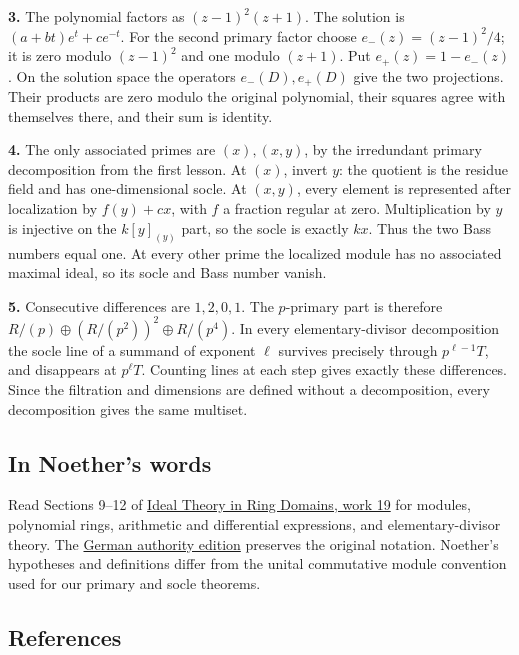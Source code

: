 \documentclass[
]{article}
\begin{document}
\textbf{3.} The polynomial factors as \((z-1)^2(z+1)\). The solution is
\((a+bt)e^t+ce^{-t}\). For the second primary factor choose
\(e_-(z)=(z-1)^2/4\); it is zero modulo \((z-1)^2\) and one modulo
\((z+1)\). Put \(e_+(z)=1-e_-(z)\). On the solution space the operators
\(e_-(D),e_+(D)\) give the two projections. Their products are zero
modulo the original polynomial, their squares agree with themselves
there, and their sum is identity.

\textbf{4.} The only associated primes are \((x),(x,y)\), by the
irredundant primary decomposition from the first lesson. At \((x)\),
invert \(y\): the quotient is the residue field and has one-dimensional
socle. At \((x,y)\), every element is represented after localization by
\(f(y)+cx\), with \(f\) a fraction regular at zero. Multiplication by
\(y\) is injective on the \(k[y]_{(y)}\) part, so the socle is exactly
\(kx\). Thus the two Bass numbers equal one. At every other prime the
localized module has no associated maximal ideal, so its socle and Bass
number vanish.

\textbf{5.} Consecutive differences are \(1,2,0,1\). The \(p\)-primary
part is therefore \(R/(p)\oplus(R/(p^2))^2\oplus R/(p^4)\). In every
elementary-divisor decomposition the socle line of a summand of exponent
\(\ell\) survives precisely through \(p^{\ell-1}T\), and disappears at
\(p^\ell T\). Counting lines at each step gives exactly these
differences. Since the filtration and dimensions are defined without a
decomposition, every decomposition gives the same multiset.

\subsection{In Noether's words}\label{in-noethers-words}

Read Sections 9--12 of
\href{https://github.com/KokunoYumeto/emmy-noether-en/blob/main/source/Noether_English_ED0014.tex}{Ideal
Theory in Ring Domains, work 19} for modules, polynomial rings,
arithmetic and differential expressions, and elementary-divisor theory.
The \href{https://doi.org/10.5281/zenodo.21908301}{German authority
edition} preserves the original notation. Noether's hypotheses and
definitions differ from the unital commutative module convention used
for our primary and socle theorems.

\subsection{References}\label{references}
\end{document}
